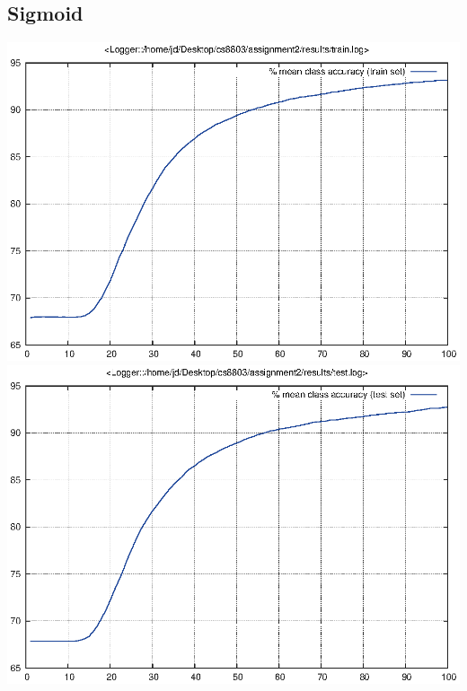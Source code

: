 \documentclass[twoside,12pt]{article}
\newcommand{\imsize}{0.5\linewidth}
\begin{document}
\subsection{Sigmoid}
\includegraphics[width=\imsize]{assignment2/results/sigmoid_train}
\includegraphics[width=\imsize]{assignment2/results/sigmoid_test}
\end{document}
